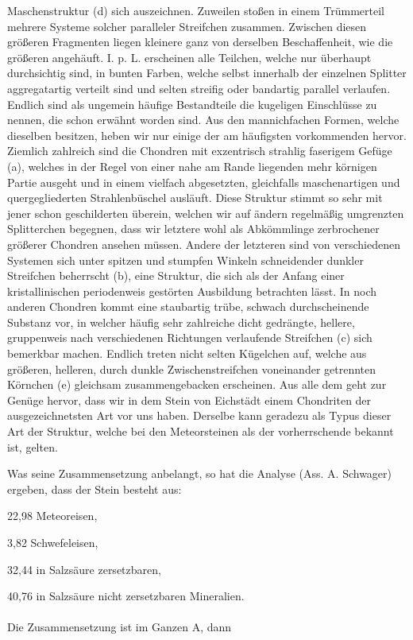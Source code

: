 \documentclass[a4paper, 11pt, oneside]{article}
\begin{document}
Maschenstruktur (d) sich auszeichnen. Zuweilen stoßen in einem Trümmerteil mehrere Systeme solcher paralleler Streifchen zusammen. Zwischen diesen größeren Fragmenten liegen kleinere ganz von derselben Beschaffenheit, wie die größeren angehäuft. I. p. L. erscheinen alle Teilchen, welche nur überhaupt durchsichtig sind, in bunten Farben, welche selbst innerhalb der einzelnen Splitter aggregatartig verteilt sind und selten streifig oder bandartig parallel verlaufen. Endlich sind als ungemein häufige Bestandteile die kugeligen Einschlüsse zu nennen, die schon erwähnt worden sind. Aus den mannichfachen Formen, welche dieselben besitzen, heben wir nur einige der am häufigsten vorkommenden hervor. Ziemlich zahlreich sind die Chondren mit exzentrisch strahlig faserigem Gefüge (a), welches in der Regel von einer nahe am Rande liegenden mehr körnigen Partie ausgeht und in einem vielfach abgesetzten, gleichfalls maschenartigen und quergegliederten Strahlenbüschel ausläuft. Diese Struktur stimmt so sehr mit jener schon geschilderten überein, welchen wir auf ändern regelmäßig umgrenzten Splitterchen begegnen, dass wir letztere wohl als Abkömmlinge zerbrochener größerer Chondren ansehen müssen. Andere der letzteren sind von verschiedenen Systemen sich unter spitzen und stumpfen Winkeln schneidender dunkler Streifchen beherrscht (b), eine Struktur, die sich als der Anfang einer kristallinischen periodenweis gestörten Ausbildung betrachten lässt. In noch anderen Chondren kommt eine staubartig trübe, schwach durchscheinende Substanz vor, in welcher häufig sehr zahlreiche dicht gedrängte, hellere, gruppenweis nach verschiedenen Richtungen verlaufende Streifchen (c) sich bemerkbar machen. Endlich treten nicht selten Kügelchen auf, welche aus größeren, helleren, durch dunkle Zwischenstreifchen voneinander getrennten Körnchen (e) gleichsam zusammengebacken erscheinen. Aus alle dem geht zur Genüge hervor, dass wir in dem Stein von Eichstädt einem Chondriten der ausgezeichnetsten Art vor uns haben. Derselbe kann geradezu als Typus dieser Art der Struktur, welche bei den Meteorsteinen als der vorherrschende bekannt ist, gelten.

Was seine Zusammensetzung anbelangt, so hat die Analyse (Ass. A. Schwager) ergeben, dass der Stein besteht aus:

22,98 Meteoreisen,

3,82 Schwefeleisen,

32,44 in Salzsäure zersetzbaren,

40,76 in Salzsäure nicht zersetzbaren Mineralien.
\paragraph{}
Die Zusammensetzung ist im Ganzen A, dann
\end{document}
